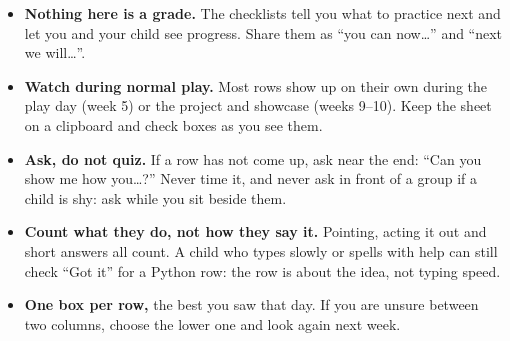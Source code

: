 
\begin{teachernote}
\begin{itemize}[itemsep=1pt]
  \item \textbf{Nothing here is a grade.} The checklists tell you what to practice next and let you
        and your child see progress. Share them as \enquote{you can now\dots} and \enquote{next we will\dots}.
  \item \textbf{Watch during normal play.} Most rows show up on their own during the play day (week 5)
        or the project and showcase (weeks 9--10). Keep the sheet on a clipboard and check boxes as you see them.
  \item \textbf{Ask, do not quiz.} If a row has not come up, ask near the end:
        \enquote{Can you show me how you\dots?} Never time it, and never ask in front of
        a group if a child is shy: ask while you sit beside them.
  \item \textbf{Count what they do, not how they say it.} Pointing, acting it out and short answers all count.
        A child who types slowly or spells with help can still check \enquote{Got it} for a Python row:
        the row is about the idea, not typing speed.
  \item \textbf{One box per row,} the best you saw that day. If you are unsure between two columns,
        choose the lower one and look again next week.
\end{itemize}
\end{teachernote}

\newcommand{\smguide}[5]{%
  \par\needspace{7\baselineskip}\noindent\textbf{\color{kcaccent}#1}\par
  \begin{itemize}[leftmargin=1.4em,itemsep=1pt,topsep=2pt]
    \item[\faSeedling] \textbf{Not yet:} #2
    \item[\faShoePrints] \textbf{Getting there:} #3
    \item[\faCheckCircle] \textbf{Got it:} #4
    \item[\faArrowRight] \textbf{If not yet:} #5
  \end{itemize}\medskip}

